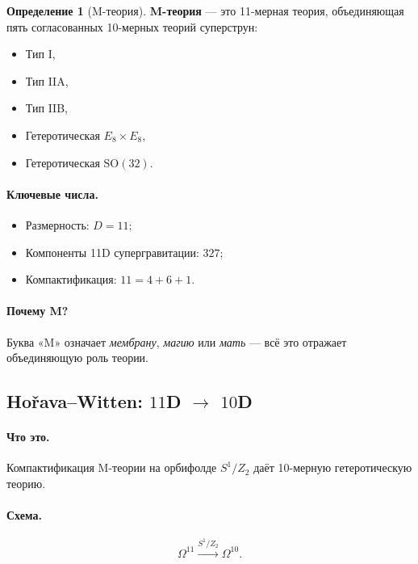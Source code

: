 \documentclass[11pt,a4paper]{article}
\newcommand{\SO}{\mathrm{SO}}
\newcommand{\Omt}{\Omega^{10}}
\newcommand{\Ome}{\Omega^{11}}
\theoremstyle{definition}
\newtheorem{definition}[theorem]{Определение}
\begin{document}
\begin{definition}[M-теория]
\label{def:mtheory}
\textbf{M-теория} — это 11-мерная теория, объединяющая пять 
согласованных 10-мерных теорий суперструн:
\begin{itemize}
    \item Тип I,
    \item Тип IIA,
    \item Тип IIB,
    \item Гетеротическая $E_8 \times E_8$,
    \item Гетеротическая $\SO(32)$.
\end{itemize}
\end{definition}

\paragraph{Ключевые числа.}
\begin{itemize}
    \item Размерность: $D = 11$;
    \item Компоненты 11D супергравитации: $327$;
    \item Компактификация: $11 = 4 + 6 + 1$.
\end{itemize}

\paragraph{Почему M?}
Буква «M» означает \emph{мембрану}, \emph{магию} или 
\emph{мать} — всё это отражает объединяющую роль теории.

\subsection{Hořava--Witten: $11$D $\to$ $10$D}
\label{subsec:horava-witten}

\paragraph{Что это.}
Компактификация M-теории на орбифолде $S^1/Z_2$ даёт 
10-мерную гетеротическую теорию.

\paragraph{Схема.}
\begin{equation}
    \Ome \xrightarrow{S^1/Z_2} \Omt.
\end{equation}
\end{document}
